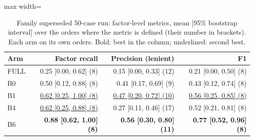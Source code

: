 \begin{table}[htbp]
\centering\footnotesize
\begin{adjustbox}{max width=\textwidth}
\begin{tabular}{@{}lrrr@{}}
\toprule
Arm & Factor recall & Precision (lenient) & F1 \\
\midrule
FULL & 0.25 [0.00, 0.62] (8) & 0.15 [0.00, 0.33] (12) & 0.21 [0.00, 0.50] (8) \\
B0 & 0.50 [0.12, 0.88] (8) & 0.41 [0.17, 0.69] (9) & 0.43 [0.12, 0.74] (8) \\
B1 & \underline{0.62 [0.25, 1.00] (8)} & \underline{0.47 [0.20, 0.72] (10)} & \underline{0.56 [0.25, 0.85] (8)} \\
B4 & \underline{0.62 [0.25, 0.88] (8)} & 0.27 [0.11, 0.46] (17) & 0.52 [0.21, 0.81] (8) \\
B6 & \textbf{0.88 [0.62, 1.00] (8)} & \textbf{0.56 [0.30, 0.80] (11)} & \textbf{0.77 [0.52, 0.96] (8)} \\
\bottomrule
\end{tabular}
\end{adjustbox}
\caption{Family superseded 50-case run: factor-level metrics, mean [95\% bootstrap interval] over the orders where the metric is defined (their number in brackets). Each arm on its own orders. Bold: best in the column; underlined: second best.}
\label{tab:table1a_v1}
\end{table}